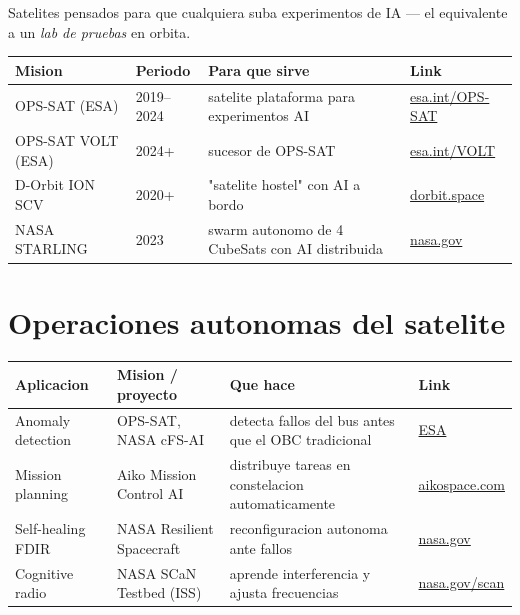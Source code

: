 \documentclass[11pt,a4paper,oneside]{report}
\begin{document}
Satelites pensados para que cualquiera suba experimentos de IA --- el
equivalente a un \emph{lab de pruebas} en orbita.

\begin{longtable}{p{3.5cm}p{2.2cm}p{6cm}p{3.5cm}}
\toprule
\textbf{Mision} & \textbf{Periodo} & \textbf{Para que sirve} & \textbf{Link} \\
\midrule
\endhead
OPS-SAT (ESA)              & 2019--2024 & satelite plataforma para experimentos AI & \href{https://www.esa.int/Enabling_Support/Operations/OPS-SAT}{esa.int/OPS-SAT} \\
OPS-SAT VOLT (ESA)         & 2024+      & sucesor de OPS-SAT  & \href{https://www.esa.int/Enabling_Support/Operations/OPS-SAT_VOLT}{esa.int/VOLT} \\
D-Orbit ION SCV            & 2020+      & "satelite hostel" con AI a bordo & \href{https://www.dorbit.space/ion-scv}{dorbit.space} \\
NASA STARLING              & 2023       & swarm autonomo de 4 CubeSats con AI distribuida & \href{https://www.nasa.gov/smallsat-institute/sst-soa/starling}{nasa.gov} \\
\bottomrule
\end{longtable}

\chapter{Operaciones autonomas del satelite}

\begin{longtable}{p{3.2cm}p{4cm}p{6cm}p{2.5cm}}
\toprule
\textbf{Aplicacion} & \textbf{Mision / proyecto} & \textbf{Que hace} & \textbf{Link} \\
\midrule
\endhead
Anomaly detection  & OPS-SAT, NASA cFS-AI         & detecta fallos del bus antes que el OBC tradicional & \href{https://www.esa.int/Enabling_Support/Operations/OPS-SAT}{ESA} \\
Mission planning   & Aiko Mission Control AI      & distribuye tareas en constelacion automaticamente & \href{https://aikospace.com}{aikospace.com} \\
Self-healing FDIR  & NASA Resilient Spacecraft    & reconfiguracion autonoma ante fallos & \href{https://www.nasa.gov}{nasa.gov} \\
Cognitive radio    & NASA SCaN Testbed (ISS)      & aprende interferencia y ajusta frecuencias & \href{https://www.nasa.gov/scan}{nasa.gov/scan} \\
\bottomrule
\end{longtable}
\end{document}

